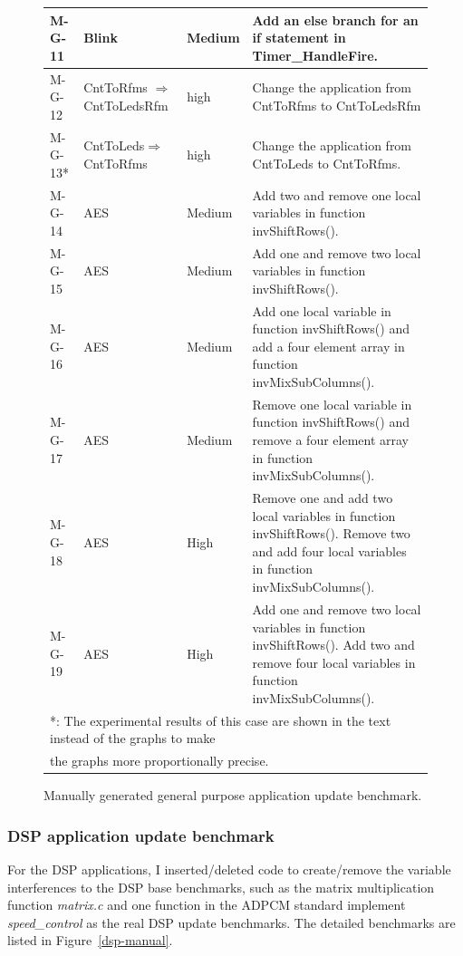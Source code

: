 \begin{figure}[htbp]
\begin{small}
\begin{tabular}{||p{0.6in}|p{1in}|p{0.5in}|p{3.5in}||}
M-G-11 & Blink & Medium & Add an else branch for an if statement in Timer\_HandleFire. \\ \hline

M-G-12 & CntToRfms $\Rightarrow$ CntToLedsRfm &high & Change the application from CntToRfms to CntToLedsRfm \\ \hline 

M-G-13* &CntToLeds$\Rightarrow$ CntToRfms &high & Change the application from CntToLeds to CntToRfms. \\ \hline 

M-G-14 & AES & Medium & Add two and remove one local variables in function invShiftRows(). \\ \hline
M-G-15 & AES & Medium & Add one and remove two local variables in function invShiftRows(). \\ \hline

M-G-16 & AES & Medium & Add one local variable in function invShiftRows() and add a four element array in function invMixSubColumns().\\ \hline
M-G-17 & AES & Medium & Remove one local variable in function invShiftRows() and remove a four element array in function invMixSubColumns().\\ \hline

M-G-18 & AES & High & Remove one and add two local variables in function invShiftRows(). Remove two and add four local variables in function invMixSubColumns().\\ \hline
M-G-19 & AES & High & Add one and remove two local variables in function invShiftRows(). Add two and remove four local variables in function invMixSubColumns().\\ \hline

\multicolumn{4}{l}{*: The experimental results of this case are shown in the text instead of the graphs to make}\\
\multicolumn{4}{l}{the graphs more proportionally precise.}\\
\end{tabular}
\end{small}
\caption{Manually generated general purpose application update benchmark.}
\label{fbench.chg1}
\end{figure}


\subsubsection{DSP application update benchmark}
For the DSP applications, I inserted/deleted code to create/remove the variable interferences to the DSP base 
benchmarks, such as the matrix multiplication function {\it matrix.c} and one function in the ADPCM standard implement 
{\it speed\_control} as the real DSP update benchmarks. 
The detailed benchmarks are listed in Figure~\ref{dsp-manual}. 

